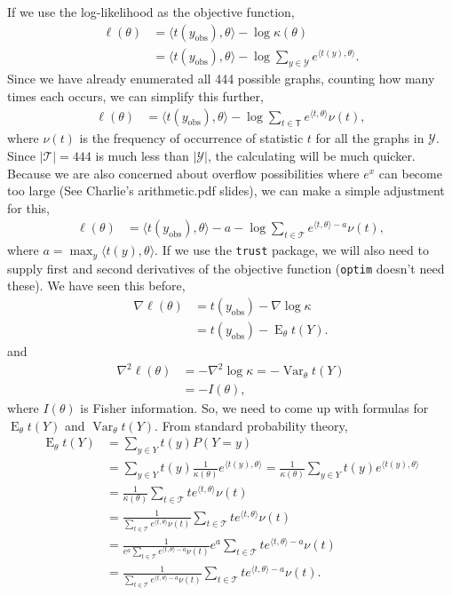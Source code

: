 \documentclass{amsbook}
\DeclareMathOperator{\E}{E}
\DeclareMathOperator{\Var}{Var}
\newcommand{\T}{\mathsf{T}}
\def\YY{{\mathcal Y}}
\def\TT{{\mathcal T}}
\newcommand{\yobs}{y_{\textrm{obs}}}
\newcommand{\inner}[1]{\langle #1 \rangle}
\theoremstyle{definition}
\theoremstyle{remark}
\begin{document}
If we use the log-likelihood as the objective function,
\begin{align*}
	\ell( \theta) &= \inner{t(\yobs), \theta} - \log \kappa( \theta ) \\
				&=  \inner{t(\yobs), \theta} - \log \sum_{y \in \YY}e^{\inner{t(y),
\theta}}.
\end{align*}
  Since we have already enumerated all 444 possible graphs, counting how many times 
each occurs, we can simplify this further, 
\begin{align*}
	\ell( \theta) &= \inner{t(\yobs), \theta} - \log \sum_{t \in \T}e^{\inner{t,
\theta}} \nu(t),
\end{align*}
where $\nu(t)$ is the frequency of occurrence of statistic $t$ for all the graphs in $
\YY$.  Since $|\TT| = 444$ is much less than $|\YY|$, the calculating will be much 
quicker.
Because we are also concerned about overflow possibilities where $e^x$ can become too 
large (See Charlie's arithmetic.pdf slides), we can make a simple adjustment for this, 
\begin{align*}
	\ell( \theta) &=  \inner{t(\yobs), \theta} - a - \log \sum_{t \in \TT}e^{\inner
{t,\theta}-a}\nu(t),
\end{align*}
where $a = \max_y \inner{t(y),\theta}$.  If we use the \texttt{trust} package, we will 
also need to supply first and second derivatives of the objective function (\texttt
{optim} doesn't need these).  We have seen this before,
\begin{align*}
	\nabla \ell( \theta ) &= t(\yobs) - \nabla \log \kappa \\
						&=  t(\yobs) - \E_\theta t(Y). 
\end{align*}
and
\begin{align*}
	\nabla^2 \ell( \theta ) &= - \nabla^2 \log \kappa = - \Var_\theta t(Y)\\
					&= -I(\theta),
\end{align*}
where $I(\theta)$ is Fisher information.  So, we need to come up with formulas for $\E_
\theta t(Y)$ and $\Var_\theta t(Y)$.  From standard probability theory, 
\begin{align*}
\E_\theta t(Y) &= \sum_{y\in Y} t(y) P( Y = y )\\
				&= \sum_{y\in Y} t(y) \frac{1}{\kappa(\theta)} e^{\inner{t(y),
\theta }} = \frac{1}{\kappa(\theta)} \sum_{y\in Y} t(y)  e^{\inner{t(y),\theta }} \\
				&= \frac{1}{\kappa(\theta)} \sum_{t\in \TT} t  e^{\inner{t,\theta }}
\nu(t) \\
				&= \frac{1}{\sum_{t\in \TT} e^{\inner{t,\theta }}\nu(t)} \sum_{t\in 
\TT} t  e^{\inner{t,\theta }}\nu(t) \\
				&= \frac{1}{e^a\sum_{t\in \TT} e^{\inner{t,\theta}-a}\nu(t)} e^a\sum_
{t\in \TT} t  e^{\inner{t,\theta}-a}\nu(t) \\
				&= \frac{1}{\sum_{t\in \TT} e^{\inner{t,\theta}-a}\nu(t)} \sum_{t\in 
\TT} t  e^{\inner{t,\theta}-a}\nu(t).
\end{align*}
\end{document}
